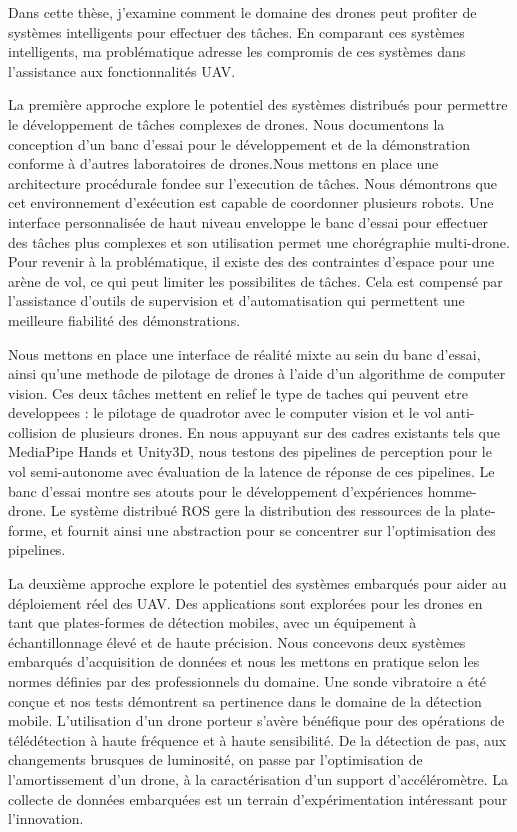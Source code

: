 Dans cette thèse, j'examine comment le domaine des drones peut profiter de systèmes intelligents pour effectuer des tâches. En comparant ces systèmes intelligents, ma problématique adresse les compromis de ces systèmes dans l'assistance aux fonctionnalités UAV. 

La première approche explore le potentiel des systèmes distribués pour permettre le développement de tâches complexes de drones. Nous documentons la conception d'un banc d'essai pour le développement et de la démonstration conforme à d'autres laboratoires de drones.Nous mettons en place une architecture procédurale fondee sur l'execution de tâches. Nous démontrons que cet environnement d'exécution est capable de coordonner plusieurs robots. Une interface personnalisée de haut niveau enveloppe le banc d'essai pour effectuer des tâches plus complexes et son utilisation permet une chorégraphie multi-drone. Pour revenir à la problématique, il existe des des contraintes d'espace pour une arène de vol, ce qui peut limiter les possibilites de tâches. Cela est compensé par l'assistance d'outils de supervision et d'automatisation qui permettent une meilleure fiabilité des démonstrations. 

Nous mettons en place une interface de réalité mixte au sein du banc d'essai, ainsi qu'une methode de pilotage de drones à l'aide d'un algorithme de computer vision. Ces deux tâches mettent en relief le type de taches qui peuvent etre developpees : le pilotage de quadrotor avec le computer vision et le vol anti-collision de plusieurs drones. En nous appuyant sur des cadres existants tels que MediaPipe Hands et Unity3D, nous testons des pipelines de perception pour le vol semi-autonome avec évaluation de la latence de réponse de ces pipelines. Le banc d'essai montre ses atouts pour le développement d'expériences homme-drone. Le système distribué ROS gere la distribution des ressources de la plate-forme, et fournit ainsi une abstraction pour se concentrer sur l'optimisation des pipelines. 

La deuxième approche explore le potentiel des systèmes embarqués pour aider au déploiement réel des UAV. Des applications sont explorées pour les drones en tant que plates-formes de détection mobiles, avec un équipement à échantillonnage élevé et de haute précision. Nous concevons deux systèmes embarqués d'acquisition de données et nous les mettons en pratique selon les normes définies par des professionnels du domaine. Une sonde vibratoire a été conçue et nos tests démontrent sa pertinence dans le domaine de la détection mobile. L'utilisation d'un drone porteur s'avère bénéfique pour des opérations de télédétection à haute fréquence et à haute sensibilité. De la détection de pas, aux changements brusques de luminosité, on passe par l'optimisation de l'amortissement d'un drone, à la caractérisation d'un support d'accéléromètre. La collecte de données embarquées est un terrain d'expérimentation intéressant pour l'innovation.